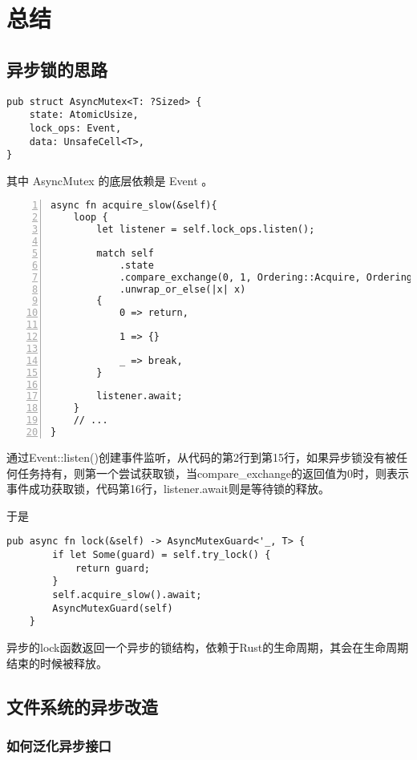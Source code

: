 \chapter{总结}
\label{chap:Summary}

\section{异步锁的思路}

\begin{lstlisting}[caption=异步锁结构]
pub struct AsyncMutex<T: ?Sized> {
    state: AtomicUsize,
    lock_ops: Event,
    data: UnsafeCell<T>,
}
\end{lstlisting}

其中 AsyncMutex 的底层依赖是 Event 。

\begin{lstlisting}[caption=异步锁的工作机制, numbers=left, label=asyncmutex]
async fn acquire_slow(&self){
    loop {
        let listener = self.lock_ops.listen();

        match self
            .state
            .compare_exchange(0, 1, Ordering::Acquire, Ordering::Acquire)
            .unwrap_or_else(|x| x)
        {
            0 => return,

            1 => {}

            _ => break,
        }

        listener.await;
    }
    // ...
}
\end{lstlisting}

通过Event::listen()创建事件监听，从代码的第2行到第15行，如果异步锁没有被任何任务持有，则第一个尝试获取锁，当compare\_exchange的返回值为0时，则表示事件成功获取锁，代码第16行，listener.await则是等待锁的释放。 

于是  
\begin{lstlisting}[caption = 异步锁]
pub async fn lock(&self) -> AsyncMutexGuard<'_, T> {
        if let Some(guard) = self.try_lock() {
            return guard;
        }
        self.acquire_slow().await;
        AsyncMutexGuard(self)
    }
\end{lstlisting}

异步的lock函数返回一个异步的锁结构，依赖于Rust的生命周期，其会在生命周期结束的时候被释放。


\section{文件系统的异步改造}

\subsection{如何泛化异步接口}

